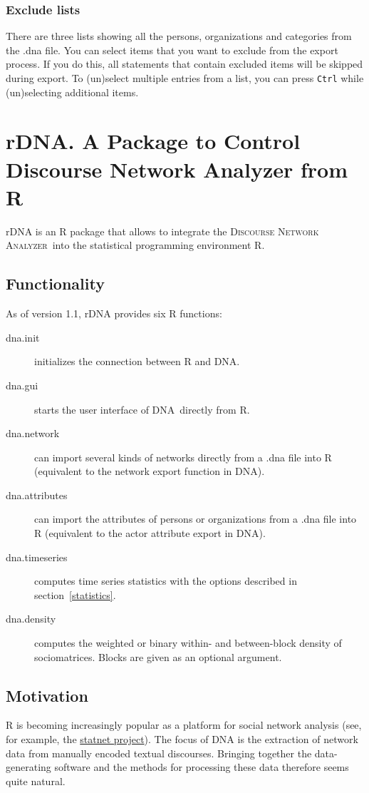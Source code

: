 \documentclass[12pt,a4paper]{scrreprt}
\newcommand{\dnalong}{\textsc{Discourse} \textsc{Network} \textsc{Analyzer}}
\newcommand{\dnashort}{\textsc{DNA}}
\newcommand{\code}[1]{\texttt{#1}}
\begin{document}
\subsection{Exclude lists}
There are three lists showing all the persons, organizations and categories from the .dna file. You can select items that you want to exclude from the export process. If you do this, all statements that contain excluded items will be skipped during export. To (un)select multiple entries from a list, you can press \code{Ctrl} while (un)selecting additional items.

\chapter{rDNA. A Package to Control Discourse Network Analyzer from R}
rDNA is an R package that allows to integrate the \dnalong\ into the statistical programming environment R.

\section{Functionality}
As of version 1.1, rDNA provides six R functions:
\begin{description}
 \item[dna.init] initializes the connection between R and \dnashort.
 \item[dna.gui] starts the user interface of \dnashort\ directly from R.
 \item[dna.network] can import several kinds of networks directly from a .dna file into R (equivalent to the network export function in \dnashort).
 \item[dna.attributes] can import the attributes of persons or organizations from a .dna file into R (equivalent to the actor attribute export in \dnashort).
 \item[dna.timeseries] computes time series statistics with the options described in section~\ref{statistics}.
 \item[dna.density] computes the weighted or binary within- and between-block density of sociomatrices. Blocks are given as an optional argument.
\end{description}

\section{Motivation}
R is becoming increasingly popular as a platform for social network analysis (see, for example, the \href{http://www.statnetproject.org}{statnet project}). The focus of DNA is the extraction of network data from manually encoded textual discourses. Bringing together the data-generating software and the methods for processing these data therefore seems quite natural.
\end{document}
